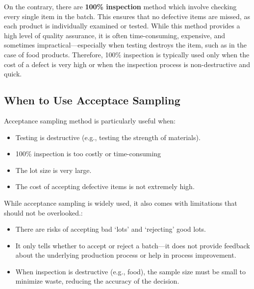 \documentclass[twoside]{book}
\begin{document}
On the contrary, there are \textbf{100\% inspection} method which involve checking every single item in the batch. This ensures that no defective items are missed, as each product is individually examined or tested. While this method provides a high level of quality assurance, it is often time-consuming, expensive, and sometimes impractical—especially when testing destroys the item, such as in the case of food products. Therefore, 100\% inspection is typically used only when the cost of a defect is very high or when the inspection process is non-destructive and quick.

\subsection{When to Use Acceptace Sampling}

Acceptance sampling method is particularly useful when:

\begin{itemize}
    \item Testing is destructive (e.g., testing the strength of materials).
    \item 100\% inspection is too costly or time-consuming
    \item The lot size is very large.
    \item The cost of accepting defective items is not extremely high.
\end{itemize}

While acceptance sampling is widely used, it also comes with limitations that should not be overlooked.:
\begin{itemize}
\item There are risks of accepting bad `lots' and `rejecting' good lots.
\item It only tells whether to accept or reject a batch—it does not provide feedback about the underlying production process or help in process improvement.
\item When inspection is destructive (e.g., food), the sample size must be small to minimize waste, reducing the accuracy of the decision.
\end{itemize}

%
\end{document}
